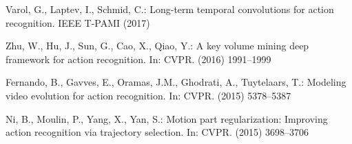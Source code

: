 \documentclass[runningheads,a4paper]{llncs}
\begin{document}
\begin{thebibliography}{10}
	Varol, G., Laptev, I., Schmid, C.:
	\newblock Long-term temporal convolutions for action recognition.
	\newblock IEEE T-PAMI (2017)

	Zhu, W., Hu, J., Sun, G., Cao, X., Qiao, Y.:
	\newblock A key volume mining deep framework for action recognition.
	\newblock In: CVPR. (2016)  1991--1999

	Fernando, B., Gavves, E., Oramas, J.M., Ghodrati, A., Tuytelaars, T.:
	\newblock Modeling video evolution for action recognition.
	\newblock In: CVPR. (2015)  5378--5387

	Ni, B., Moulin, P., Yang, X., Yan, S.:
	\newblock Motion part regularization: Improving action recognition via
	trajectory selection.
	\newblock In: CVPR. (2015)  3698--3706

\end{thebibliography}
\end{document}
